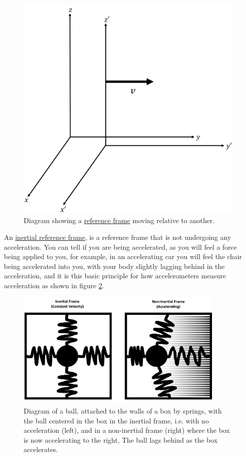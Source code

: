 \begin{figure}[H]
	\centering
	\includegraphics[width=0.35 \textwidth]{images/pdf/Reference Frames.pdf}
	\caption{Diagram showing a \protect\hyperlink{def-Reference-frame}{reference frame} moving relative to another.}
	\label{fig: Reference Frames}
\end{figure}

An \hyperlink{def-Inertial-reference-frame}{inertial reference frame}, is a reference frame that is not undergoing any acceleration. You can tell if you are being accelerated, as you will feel a force being applied to you, for example, in an accelerating car you will feel the chair being accelerated into you, with your body slightly lagging behind in the acceleration, and it is this basic principle for how accelerometers measure acceleration as shown in figure \ref{fig: spring boxes}.

\begin{figure}[H]
	\centering
	\includegraphics[width=0.9\textwidth]{images/pdf/Spring_boxes.pdf}
	\caption{Diagram of a ball, attached to the walls of a box by springs, with the ball centered in the box in the inertial frame, i.e. with no acceleration (left), and in a non-inertial frame (right) where the box is now accelerating to the right, The ball lags behind as the box accelerates.}
	\label{fig: spring boxes}
\end{figure}

